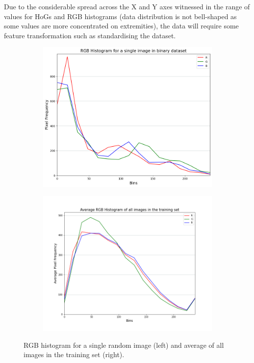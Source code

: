 \documentclass[letterpaper,12pt]{article}
\begin{document}
Due to the considerable spread across the X and Y axes witnessed in the range of values for HoGs and RGB histograms (data distribution is not bell-shaped  as some values are more concentrated on extremities), the data will require some feature transformation such as standardising the dataset.

\begin{figure}[h]
\centering
\begin{subfigure}{.41\textwidth}
  \centering
  \includegraphics[width=\textwidth]{results/rgb_hist_single_image_binary.png}
  \label{fig:rgb_hist_single_image_binary}
\end{subfigure}%
\begin{subfigure}{.5\textwidth}
  \centering
  \includegraphics[width=\textwidth]{jupyter prototyping/rgb_avg_hist_all_training_set.png}
  \label{fig:rgb_avg_hist_all_training_set}
\end{subfigure}
\caption{\label{fig:rgb-hists}RGB histogram for a single random image (left) and average of all images in the training set (right).}
\end{figure}
\end{document}
